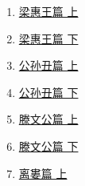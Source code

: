 \documentclass[11pt]{article}
\begin{document}
\begin{multicols}{5}
	\begin{enumerate}
		\item \href{https://mp.weixin.qq.com/s/4n7Nhbrd4xF2wQEcnkSxhw}{梁惠王篇 上}	%
		\item \href{https://mp.weixin.qq.com/s/0TmQsB2IZlX-Q9AjR__hoQ}{梁惠王篇 下}	%
		\item \href{https://mp.weixin.qq.com/s/iWeMXt2Rh8iuEViH1al2xQ}{公孙丑篇 上}	%
		\item \href{https://mp.weixin.qq.com/s/EIrv9sr4awV_oV84xcM1gQ}{公孙丑篇 下}	%
		\item \href{https://mp.weixin.qq.com/s/1IYic-GAXF4sG5EhxDFhJw}{滕文公篇 上}	%
		\item \href{https://mp.weixin.qq.com/s/-fkh4MaXGWBpbTcaZRL8Fg}{滕文公篇 下}	%
		\item \href{https://mp.weixin.qq.com/s/t5xhDcQL2bObl8vB1jlCEA}{离婁篇 上}	%
	\end{enumerate}
\end{multicols}
\end{document}

